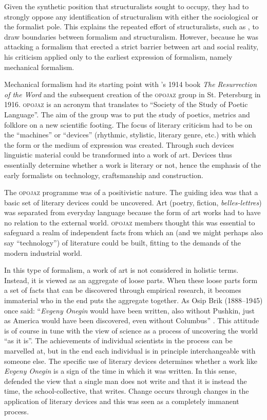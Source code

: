 \documentclass[output=paper]{langscibook}
\begin{document}
Given the synthetic position that structuralists sought to occupy, they had to strongly oppose any identification of structuralism with either the sociological or the formalist pole. This explains the repeated effort of structuralists, such as {\Mukarovsky}, to draw boundaries between formalism and structuralism. However, because he was attacking a formalism that erected a strict barrier between art and social reality, his criticism applied only to the earliest expression of formalism, namely mechanical formalism.

Mechanical formalism had its starting point with {\Shklovsky}'s 1914 book \emph{The Resurrection of the Word} and the subsequent creation of the \textsc{opojaz} group in St. Petersburg in 1916. \textsc{opojaz} is an acronym that translates to ``Society of the Study of Poetic Language''. The aim of the group was to put the study of poetics, metrics and folklore on a new scientific footing. The focus of literary criticism had to be on the ``machines'' or ``devices'' (rhythmic, stylistic, literary genre, etc.) with which the form or the medium of expression was created. Through such devices linguistic material could be transformed into a work of art. Devices thus essentially determine whether a work is literary or not, hence the emphasis of the early formalists on technology, craftsmanship and construction.

The \textsc{opojaz} programme was of a positivistic nature. The guiding idea was that a basic set of literary devices could be uncovered. Art (poetry, fiction, \emph{belles-lettres}) was separated from everyday language because the form of art works had to have no relation to the external world. \textsc{opojaz} members thought this was essential to safeguard a realm of independent facts from which an  (and we might perhaps also say ``technology'') of literature could be built, fitting to the demands of the modern industrial world.

In this type of formalism, a work of art is not considered in holistic terms. Instead, it is viewed as an aggregate of loose parts. When these loose parts form a set of facts that can be discovered through empirical research, it becomes immaterial who in the end puts the aggregate together. As Osip Brik (1888--1945) once said: ``\emph{Evgeny Onegin} would have been written, also without Pushkin, just as America would have been discovered, even without Columbus'' \citep[213]{Brik1923}. This attitude is of course in tune with the view of science as a process of uncovering the world ``as it is''. The achievements of individual scientists in the process can be marvelled at, but in the end each individual is in principle interchangeable with someone else. The specific use of literary devices determines whether a work like \emph{Evgeny Onegin} is a sign of the time in which it was written. In this sense, {\Shklovsky} defended the view that a single man does not write and that it is instead the time, the school-collective, that writes. Change occurs through changes in the application of literary devices and this was seen as a completely immanent process.
\end{document}
